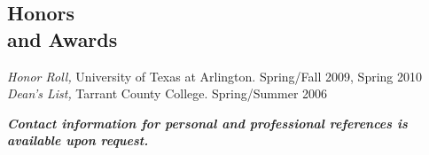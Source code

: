\documentclass[margin]{res}
\newcommand{\sectionspace}{\vspace{8pt}}
\begin{document}
\begin{resume}
\sectionspace


\section{\textsf{Honors \\and Awards}}

                \textit{Honor Roll,} University of Texas at Arlington. Spring/Fall 2009, Spring 2010 \\
                \textit{Dean's List,} Tarrant County College. Spring/Summer 2006

\sectionspace


\textit{\textbf{\footnotesize Contact information for personal and professional references is available upon request.}}


\end{resume}
\end{document}
